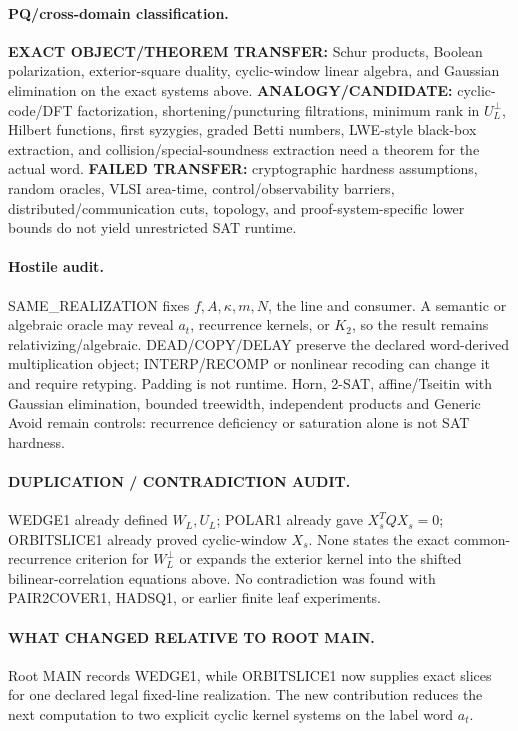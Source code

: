 \documentclass[11pt]{article}
\begin{document}
\paragraph{PQ/cross-domain classification.}
\textbf{EXACT OBJECT/THEOREM TRANSFER:} Schur products, Boolean polarization, exterior-square duality, cyclic-window linear algebra, and Gaussian elimination on the exact systems above.
\textbf{ANALOGY/CANDIDATE:} cyclic-code/DFT factorization, shortening/puncturing filtrations, minimum rank in \(U_L^\perp\), Hilbert functions, first syzygies, graded Betti numbers, LWE-style black-box extraction, and collision/special-soundness extraction need a theorem for the actual word.
\textbf{FAILED TRANSFER:} cryptographic hardness assumptions, random oracles, VLSI area-time, control/observability barriers, distributed/communication cuts, topology, and proof-system-specific lower bounds do not yield unrestricted SAT runtime.

\paragraph{Hostile audit.}
SAME\_REALIZATION fixes \(f,A,\kappa,m,N\), the line and consumer. A semantic or algebraic oracle may reveal \(a_t\), recurrence kernels, or \(K_2\), so the result remains relativizing/algebraic. DEAD/COPY/DELAY preserve the declared word-derived multiplication object; INTERP/RECOMP or nonlinear recoding can change it and require retyping. Padding is not runtime. Horn, 2-SAT, affine/Tseitin with Gaussian elimination, bounded treewidth, independent products and Generic Avoid remain controls: recurrence deficiency or saturation alone is not SAT hardness.

\paragraph{DUPLICATION / CONTRADICTION AUDIT.}
WEDGE1 already defined \(W_L,U_L\); POLAR1 already gave \(X_s^TQX_s=0\); ORBITSLICE1 already proved cyclic-window \(X_s\). None states the exact common-recurrence criterion for \(W_L^\perp\) or expands the exterior kernel into the shifted bilinear-correlation equations above. No contradiction was found with PAIR2COVER1, HADSQ1, or earlier finite leaf experiments.

\paragraph{WHAT CHANGED RELATIVE TO ROOT MAIN.}
Root MAIN records WEDGE1, while ORBITSLICE1 now supplies exact slices for one declared legal fixed-line realization. The new contribution reduces the next computation to two explicit cyclic kernel systems on the label word \(a_t\).
\end{document}
